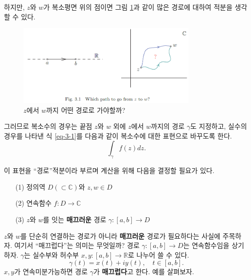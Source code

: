 하지만, $z$와 $w$가 복소평면 위의 점이면
그림 \ref{fig-3-1}과 같이 많은 경로에 대하여 적분을 생각할 수 있다.

\begin{figure}[!h]
\begin{center}
\includegraphics[width=0.8\textwidth]{./SaltChapter/fig-3-1}
\end{center}
\caption{$z$에서 $w$까지 어떤 경로로 가야할까?}
\label{fig-3-1}
\end{figure}

그러므로 복소수의 경우는 끝점 $z$와 $w$ 외에
$z$에서 $w$까지의 경로 $\gamma$도 지정하고,
실수의 경우를 나타낸 식 \eqref{eq-3-1}를
다음과 같이 복소수에 대한 표현으로 바꾸도록 한다.
\[
\int_\gamma f(z)dz.
\]

이 표현을 ``경로''적분이라 부르며
계산을 위해 다음을 결정할 필요가 있다.
\begin{itemize}
\item[(1)] 정의역  $D(\subset \mathbb C)$와 $z, w\in D$
\item[(2)] 연속함수 $f:D\to \mathbb C$
\item[(3)] $z$와 $w$를 잇는 {\bf 매끄러운} 경로 $\gamma: [a,b] \to D$
\end{itemize}

$z$와 $w$를 단순히 연결하는 경로가 아니라  {\bf 매끄러운} 경로가
필요하다는 사실에 주목하자.
여기서 ``매끄럽다''는 의미는 무엇일까?
경로 $\gamma : [a,b] \to D$는 연속함수임을 상기하자.
$\gamma$는 실수부와 허수부 $x,y: [a,b] \to \mathbb R$로 나누어  쓸 수 있다.
\[
\gamma(t) = x(t) + iy(t), \quad t\in [a,b].
\]
$x, y$가 연속미분가능하면
경로 $\gamma$가 {\bf 매끄럽다}고 한다.
예를 살펴보자.


